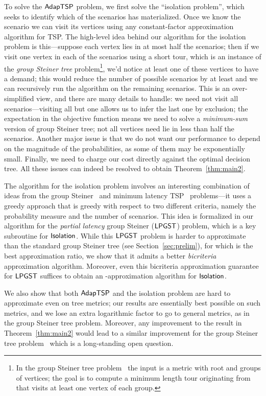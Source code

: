 \documentclass[11pt]{article}
\def\isoprob{\ensuremath{{\sf Isolation}}\xspace}
\def\stsp{\ensuremath{{\sf AdapTSP}}\xspace}
\def\lpgst{\ensuremath{{\sf LPGST}}\xspace}
\begin{document}
To solve the \stsp problem, we first solve the ``isolation problem'', which seeks to identify which of the 
scenarios has materialized. Once we know the scenario we can visit its vertices using any constant-factor approximation algorithm for TSP. 
The high-level idea behind our algorithm for the isolation problem is this---suppose each vertex lies in at most half the scenarios; then if we
visit one vertex in each of the  scenarios using a short tour, which is an instance of the {\em group Steiner tree} problem\footnote{In the group Steiner tree problem~\cite{gkr} the input is a metric  with root  and groups  of vertices; the goal is to compute a minimum length tour originating from  that visits at least one vertex of each group.}, we'd
notice at least one of these vertices to have a demand; this would reduce the number of possible scenarios by at least  and we can recursively run the algorithm on the remaining scenarios.
This is an over-simplified view, and there are many details to handle: we need not visit all
scenarios---visiting all but one allows us to infer the last one by exclusion; the expectation in the objective
function means we need to solve a \emph{minimum-sum} version of group Steiner tree; not all vertices need lie in less
than half the scenarios.  Another major issue is that we do not want our performance to depend on the magnitude of the
probabilities, as some of them may be exponentially small.  
Finally, we need to charge our cost directly against the optimal decision tree. 
All these issues can indeed be resolved to obtain Theorem~\ref{thm:main2}.




The algorithm for the isolation problem involves an interesting combination of ideas from the group Steiner~\cite{gkr,ccgg} and minimum
latency TSP~\cite{bccprs,cgrt,fhr} problems---it uses a greedy approach that is greedy with respect to two different
criteria, namely the probability measure and the number of scenarios. This idea is formalized in our algorithm for 
the {\em partial latency} group Steiner (\lpgst) problem, which is a key subroutine for \isoprob. While this \lpgst
problem is harder to approximate than the standard group Steiner tree (see Section~\ref{sec:prelim}), for which  is the best approximation ratio, we show  that it admits a better
 {\em bicriteria} approximation algorithm. Moreover, even this bicriteria approximation
guarantee for \lpgst suffices to obtain an -approximation algorithm for \isoprob. 




We also show that both \stsp and the isolation problem are  hard to approximate even on tree metrics;
our results are essentially best possible on such metrics, and we lose an extra logarithmic factor to go to general
metrics, as in the group Steiner tree problem. Moreover, any improvement to the result in Theorem~\ref{thm:main2} would lead to a similar improvement for the group Steiner tree problem~\cite{gkr,hk03,cp05} which is a long-standing open question. 
\end{document}
